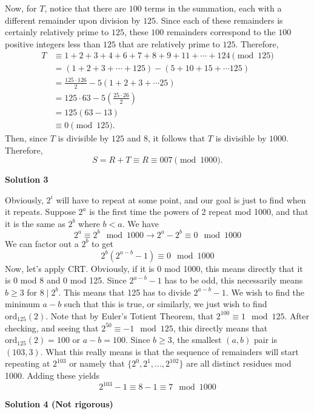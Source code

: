 \begin{enumerate}
 Now, for $T$, notice that there are $100$ terms in the summation, each with a different remainder upon division by $125.$ Since each of these remainders is certainly relatively prime to $125$, these $100$ remainders correspond to the $100$ positive integers less than $125$ that are relatively prime to $125.$ Therefore, 
 \begin{align*}T &\equiv 1 + 2 + 3 + 4 + 6 + 7 + 8 + 9 + 11 + \cdots + 124 \pmod{125} \\ &= \left(1 + 2 + 3 + \cdots + 125\right) - \left(5 + 10 + 15 + \cdots 125\right) \\ &= \frac{125 \cdot 126}{2} - 5\left(1 + 2 + 3 + \cdots 25\right) \\ &= 125 \cdot 63 - 5\left(\frac{25 \cdot 26}{2}\right) \\ &= 125\left(63 - 13\right) \\ &\equiv 0 \pmod{125}.\end{align*}
Then, since $T$ is divisible by $125$ and $8$, it follows that $T$ is divisible by $1000.$ Therefore, 
 \[S = R + T \equiv R \equiv \boxed{007} \pmod{1000}.\]




\textbf{Solution 3}

Obviously, $2^i$ will have to repeat at some point, and our goal is just to find when it repeats. Suppose $2^a$ is the first time the powers of 2 repeat mod 1000, and that it is the same as $2^b$ where $b < a.$ We have
 \[2^a \equiv 2^b \mod 1000 \rightarrow 2^a - 2^b \equiv 0 \mod 1000\]We can factor out a $2^b$ to get
 \[2^b\left(2^{a-b} - 1\right) \equiv 0 \mod 1000\]Now, let's apply CRT. Obviously, if it is 0 mod 1000, this means directly that it is 0 mod 8 and 0 mod 125. Since $2^{a-b} - 1$ has to be odd, this necessarily means $b \ge 3$ for $8 \mid 2^b.$ This means that 125 has to divide $2^{a-b} - 1.$ We wish to find the minimum $a - b$ such that this is true, or similarly, we just wish to find $\text{ord}_{125}(2).$ Note that by Euler's Totient Theorem, that $2^{100} \equiv 1 \mod 125.$ After checking, and seeing that $2^{50} \equiv -1 \mod 125$, this directly means that $\text{ord}_{125}(2) = 100$ or $a - b = 100.$ Since $b \ge 3$, the smallest $(a, b)$ pair is$(103, 3).$ What this really means is that the sequence of remainders will start repeating at $2^{103}$ or namely that $\{2^0, 2^1, ..., 2^{102}\}$ are all distinct residues mod 1000. Adding these yields 
 \[2^{103} - 1 \equiv 8 - 1 \equiv \boxed{7} \mod 1000\]




\textbf{Solution 4 (Not rigorous)}


\end{enumerate}
